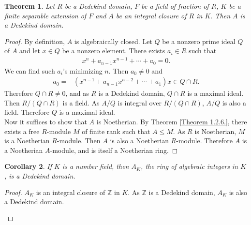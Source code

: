 \documentclass[12pt]{article}
\theoremstyle{plain}
\newtheorem{theorem}{Theorem}[section]
\newtheorem{corollary}[theorem]{Corollary}
\theoremstyle{remark}
\theoremstyle{definition}
\newcommand{\Z}{\mathbb{Z}}
\newcommand{\Q}{\mathbb{Q}}
\begin{document}
\begin{theorem}
    Let $R$ be a Dedekind domain, $F$ be a field of fraction of $R$, $K$ be a finite separable extension of $F$ and $A$ be an integral closure of $R$ in $K$. Then $A$ is a Dedekind domain.
\end{theorem}
\begin{proof}
    By definition, $A$ is algebraically closed. Let $Q$ be a nonzero prime ideal $Q$ of $A$ and let $x\in Q$ be a nonzero element. There exists $a_i\in R$ such that
    \begin{align*}
        x^n+a_{n-1}x^{n-1}+\cdots + a_0 = 0.
    \end{align*}
    We can find such $a_i$'s minimizing $n$. Then $a_0\neq 0$ and
    \begin{align*}
        a_0 = -\left(x^{n-1}+a_{n-1}x^{n-2}+\cdots+a_1\right)x\in Q\cap R.
    \end{align*}
    Therefore $Q\cap R\neq 0$, and as $R$ is a Dedekind domain, $Q\cap R$ is a maximal ideal. Then $R/(Q\cap R)$ is a field. As $A/Q$ is integral over $R/(Q\cap R)$, $A/Q$ is also a field. Therefore $Q$ is a maximal ideal. \\
    Now it suffices to show that $A$ is Noetherian. By Theorem \ref{Theorem 1.2.6.}, there exists a free $R$-module $M$ of finite rank such that $A\le M$. As $R$ is Noetherian, $M$ is a Noetherian $R$-module. Then $A$ is also a Noetherian $R$-module. Therefore $A$ is a Noetherian $A$-module, and is itself a Noetherian ring.
\end{proof}

\begin{corollary}
    If $K$ is a number field, then $A_K$, the ring of algebraic integers in $K$, is a Dedekind domain.
\end{corollary}
\begin{proof}
    $A_K$ is an integral closure of $\Z$ in $K$. As $\Z$ is a Dedekind domain, $A_K$ is also a Dedekind domain.
    \begin{figure}[H]
        \centering
    \end{figure}
\end{proof}
\end{document}
